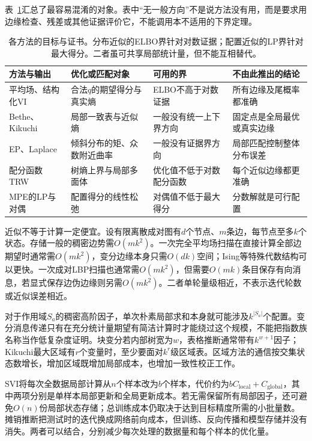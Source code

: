 表~\ref{tab:pgm-variational-objectives}汇总了最容易混淆的对象。表中“无一般方向”不是说方法没有用，而是要求用边缘检查、残差或其他证据评价它，不能调用本不适用的下界定理。
\begin{table}[htbp]
  \centering
  \begin{tabularx}{\linewidth}{lXXX}
    \toprule
    方法与输出 & 优化或匹配对象 & 可用的界 & 不由此推出的结论\\
    \midrule
    平均场、结构化VI & 合法$q$的期望得分与真实熵 & ELBO不高于对数证据 & 所有边缘及尾概率都准确\\
    Bethe、Kikuchi & 局部一致表与近似熵 & 一般没有统一上下界方向 & 固定点是全局最优或真实边缘\\
    EP、Laplace & 倾斜分布的矩、众数附近曲率 & 一般没有证据界方向 & 局部匹配控制整体分布误差\\
    配分函数TRW & 树熵上界与局部多面体 & 优化值不低于对数配分函数 & 每个近似边缘都更准确\\
    MPE的LP与对偶 & 配置得分的线性松弛 & 对偶值不低于最大得分 & 分数解就是可行配置\\
    \bottomrule
  \end{tabularx}
  \caption{各方法的目标与证书。分布近似的ELBO界针对对数证据；配置近似的LP界针对最大得分。二者虽可共享局部统计量，但不能互相替代。}
  \label{tab:pgm-variational-objectives}
\end{table}

近似不等于计算一定便宜。设有限离散成对图有$d$个节点、$m$条边，每节点至多$k$个状态。存储一般的稠密边势需$O(mk^2)$。一次完全平均场扫描在直接计算全部边期望时通常需$O(mk^2)$，变分边缘本身只需$O(dk)$空间；Ising等特殊代数结构可以更快。一次成对LBP扫描也通常需$O(mk^2)$，但需要$O(mk)$条目保存有向消息，若显式保存边伪边缘则另需$O(mk^2)$。二者单轮量级相近，不表示迭代轮数或近似误差相近。

对于作用域$S_a$的稠密高阶因子，单次朴素局部求和本身就可能涉及$k^{|S_a|}$个配置。变分消息传递只有在充分统计量期望有简洁计算时才能绕过这个规模，不能把指数族名称当作低复杂度证明。块变分若内部树宽为$w$，表格推断通常带有$k^{w+1}$因子；Kikuchi最大区域有$r$个变量时，至少要面对$k^r$级区域表。区域方法的通信按交集状态数增长，增加区域既增加局部成本，也增加一致性校正工作。

SVI将每次全数据局部计算从$n$个样本改为$b$个样本，代价约为$bC_{\mathrm{local}}+C_{\mathrm{global}}$，其中两项分别是单样本局部更新和全局更新成本。若无需保留所有局部因子，还可避免$O(n)$份局部状态存储；总训练成本仍取决于达到目标精度所需的小批量数。摊销推断把测试时的迭代换成网络前向成本，但训练、反向传播和模型存储并没有消失。两者可以结合，分别减少每次处理的数据量和每个样本的优化量。

